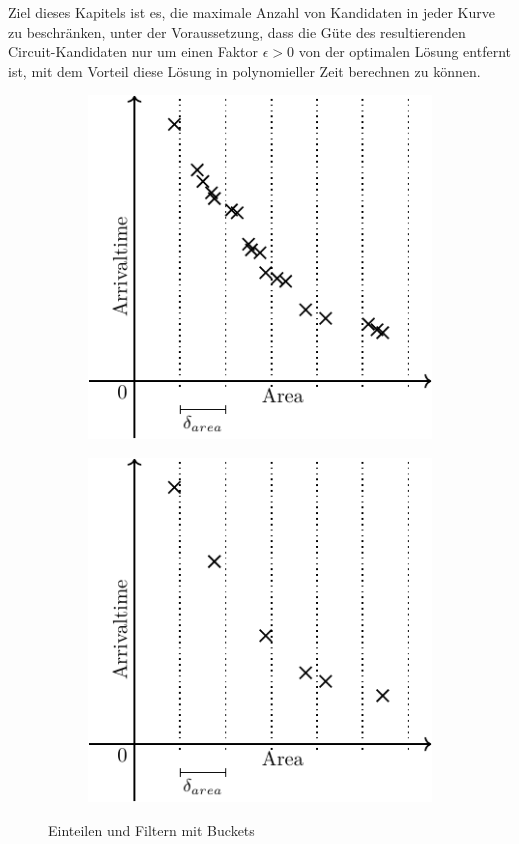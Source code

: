\documentclass[11pt, a4paper, german]{article}
\begin{document}
Ziel dieses Kapitels ist es, die maximale Anzahl von Kandidaten in jeder Kurve zu beschränken, unter der Voraussetzung, dass die Güte des resultierenden Circuit-Kandidaten nur um einen Faktor $\epsilon > 0$ von der optimalen Lösung entfernt ist, mit dem Vorteil diese Lösung in polynomieller Zeit berechnen zu können. 
\begin{figure}[h]
\centering
\begin{subfigure}{.5\textwidth}
  \centering
  \includegraphics[width=.7\linewidth]{pictures/compiled/tradeoff_kurve_buckets}
\end{subfigure}%
\begin{subfigure}{.5\textwidth}
  \centering
  \includegraphics[width=.7\linewidth]{pictures/compiled/tradeoff_kurve_filtered}
\end{subfigure}
\caption{Einteilen und Filtern mit Buckets}
\label{bild:tradeoff_kurven_filtern}
\end{figure}
\end{document}
